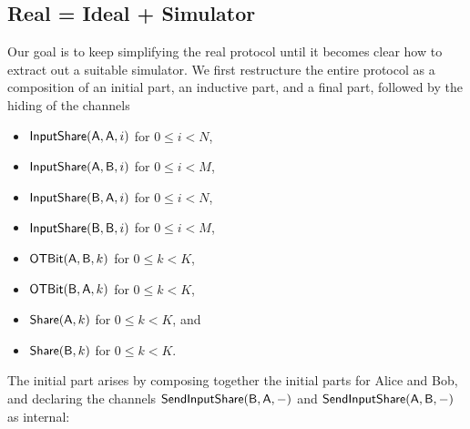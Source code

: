 \subsection{Real = Ideal + Simulator}
Our goal is to keep simplifying the real protocol until it becomes clear how to extract out a suitable simulator. We first restructure the entire protocol as a composition of an initial part, an inductive part, and a final part, followed by the hiding of the channels \smallskip
\begin{itemize}
\item $\mathsf{InputShare}(\mathsf{A},\mathsf{A},i)$ for $0 \leq i < N$,
\item $\mathsf{InputShare}(\mathsf{A},\mathsf{B},i)$ for $0 \leq i < M$,
\item $\mathsf{InputShare}(\mathsf{B},\mathsf{A},i)$ for $0 \leq i < N$,
\item $\mathsf{InputShare}(\mathsf{B},\mathsf{B},i)$ for $0 \leq i < M$,\smallskip
\item $\mathsf{OTBit}(\mathsf{A},\mathsf{B},k)$ for $0 \leq k < K$,
\item $\mathsf{OTBit}(\mathsf{B},\mathsf{A},k)$ for $0 \leq k < K$,\smallskip
\item $\mathsf{Share}(\mathsf{A},k)$ for $0 \leq k < K$, and
\item $\mathsf{Share}(\mathsf{B},k)$ for $0 \leq k < K$.
\end{itemize}

The initial part arises by composing together the initial parts for Alice and Bob, and declaring the channels $\mathsf{SendInputShare}(\mathsf{B},\mathsf{A},-)$ and $\mathsf{SendInputShare}(\mathsf{A},\mathsf{B},-)$ as internal:

